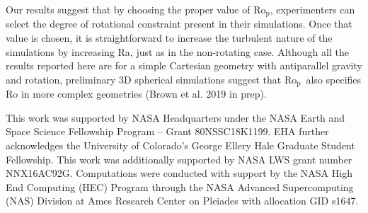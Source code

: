 \documentclass[twocolumn, amsmath, amsfonts, amssymb]{aastex62}
\newcommand{\pro}{\ensuremath{\text{Ro}_{\text{p}}}}
\begin{document}
Our results suggest that by choosing the proper value of \pro, experimenters
can select the degree of rotational constraint present in their simulations. 
Once that value is chosen, it is straightforward to increase the turbulent nature of 
the simulations by increasing Ra, just as in the non-rotating case. 
Although all the results reported here are for a simple Cartesian geometry with 
antiparallel gravity and rotation, preliminary 3D spherical simulations suggest that 
\pro$\,$ also specifies Ro in more complex geometries (Brown et al. 2019 in prep).


\begin{acknowledgements}
This work was supported by NASA Headquarters under the NASA Earth and Space
Science Fellowship Program -- Grant 80NSSC18K1199.
EHA further acknowledges the University of Colorado's George 
Ellery Hale Graduate Student Fellowship.
This work was additionally supported by  NASA LWS grant number NNX16AC92G.  
Computations were conducted 
with support by the NASA High End Computing (HEC) Program through the NASA 
Advanced Supercomputing (NAS) Division at Ames Research Center on Pleiades
with allocation GID s1647.
\end{acknowledgements}


\end{document}
